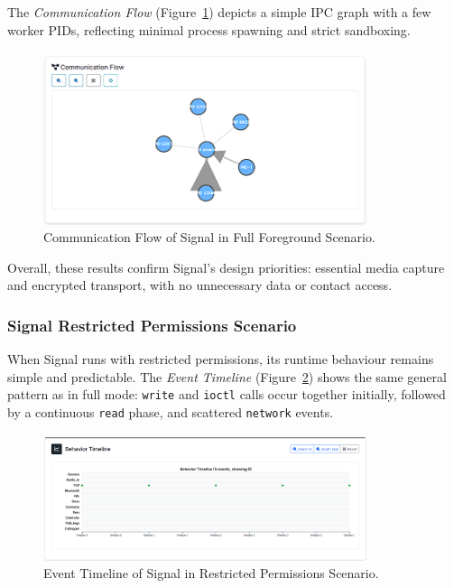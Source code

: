 \documentclass[a4paper,12pt]{report}
\begin{document}
The \textit{Communication Flow} (Figure~\ref{fig:signal-full-flow}) depicts a simple IPC graph with a few worker PIDs, reflecting minimal process spawning and strict sandboxing.

\begin{figure}[H]
    \centering
    \includegraphics[width=0.85\textwidth]{signal-full-flow.png}
    \caption{Communication Flow of Signal in Full Foreground Scenario.}
    \label{fig:signal-full-flow}
\end{figure}

Overall, these results confirm Signal’s design priorities: essential media capture and encrypted transport, with no unnecessary data or contact access.

\subsubsection{Signal Restricted Permissions Scenario}

When Signal runs with restricted permissions, its runtime behaviour remains simple and predictable. The \textit{Event Timeline} (Figure~\ref{fig:signal-none-events}) shows the same general pattern as in full mode: \texttt{write} and \texttt{ioctl} calls occur together initially, followed by a continuous \texttt{read} phase, and scattered \texttt{network} events.

\begin{figure}[H]
    \centering
    \includegraphics[width=0.85\textwidth]{signal-none-events.png}
    \caption{Event Timeline of Signal in Restricted Permissions Scenario.}
    \label{fig:signal-none-events}
\end{figure}
\end{document}
